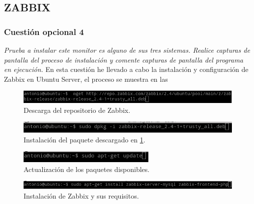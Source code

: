 \subsection{ZABBIX}
\subsubsection{Cuestión opcional 4}
\textit{Prueba a instalar este monitor es alguno de sus tres sistemas. Realice capturas de pantalla del proceso de instalación y comente capturas de pantalla del programa en ejecución.}
En esta cuestión he llevado a cabo la instalación y configuración de Zabbix en Ubuntu Server, el proceso se muestra en las  \cite{zab}

\begin{figure}[H]
  \begin{center}
    \includegraphics[width=1\textwidth]{imagenes/zab1}
    \caption{Descarga del repositorio de Zabbix.}
    \label{fig30}
  \end{center}
\end{figure}

\begin{figure}[H]
  \begin{center}
    \includegraphics[width=1\textwidth]{imagenes/zab2}
    \caption{Instalación del paquete descargado en \cref{fig30}.}
    \label{fig31}
  \end{center}
\end{figure}

\begin{figure}[H]
  \begin{center}
    \includegraphics[width=0.6\textwidth]{imagenes/zab3}
    \caption{Actualización de los paquetes disponibles.}
    \label{fig32}
  \end{center}
\end{figure}

\begin{figure}[H]
  \begin{center}
    \includegraphics[width=1\textwidth]{imagenes/zab4}
    \caption{Instalación de Zabbix y sus requisitos.}
    \label{fig33}
  \end{center}
\end{figure}

